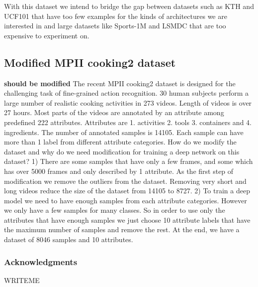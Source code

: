 \documentclass{article} %
\begin{document}
With this dataset we intend to bridge the gap between datasets such as KTH \cite{kth} and UCF101 \cite{ucf101} that have too few examples for the kinds of architectures we are interested in and large datasets like Sports-1M \cite{sports1m} and LSMDC \cite{lsmdc} that are too expensive to experiment on.

\subsection{Modified MPII cooking2 dataset}
\textbf{should be modified} The recent MPII cooking2 dataset is designed for the challenging task of fine-grained action recognition. 30 human subjects perform a large number of realistic cooking activities in 273 videos. Length of videos is over 27 hours. Most parts of the videos are annotated by an attribute among predefined 222 attributes. Attributes are 1. activities 2. tools 3. containers and 4. ingredients. The number of annotated samples is 14105. Each sample can have more than 1 label from different attribute categories. 
How do we modify the dataset and why do we need modification for training a deep network on this dataset? 
1) There are some samples that have only a few frames, and some which has over 5000 frames and only described by 1 attribute. As the first step of modification we remove the outliers from the dataset. Removing very short and long videos reduce the size of the dataset from 14105 to 8727.
2) To train a deep model we need to have enough samples from each attribute categories. However we only have a few samples for many classes. So in order to use only the attributes that have enough samples we just choose 10 attribute labels that have the maximum number of samples and remove the rest. At the end, we have a dataset of 8046 samples and 10 attributes.
\subsubsection*{Acknowledgments}

WRITEME



\end{document}
